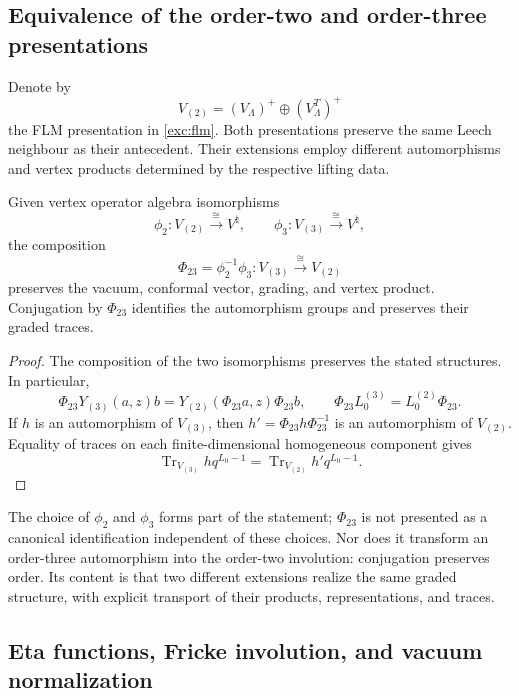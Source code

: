 \subsection{Equivalence of the order-two and order-three presentations}
\label{km:equivalencia-dos-tres}

Denote by
\[
 V_{(2)}=(V_\Lambda)^+\oplus(V_\Lambda^T)^+
\]
the FLM presentation in \eqref{exc:flm}. Both presentations preserve
the same Leech neighbour as their antecedent. Their extensions employ
different automorphisms and vertex products determined by
the respective lifting data.

\begin{theorem}
\label{km:equivalencia-voa}
Given vertex operator algebra isomorphisms
\[
 \phi_2:V_{(2)}\xrightarrow{\ \cong\ }V^\natural,
 \qquad
 \phi_3:V_{(3)}\xrightarrow{\ \cong\ }V^\natural,
\]
the composition
\begin{equation}
 \Phi_{23}=\phi_2^{-1}\phi_3:
 V_{(3)}\xrightarrow{\ \cong\ }V_{(2)}
 \label{km:Phi23}
\end{equation}
preserves the vacuum, conformal vector, grading, and vertex
product. Conjugation by \(\Phi_{23}\) identifies the automorphism
groups and preserves their graded traces.
\end{theorem}
\begin{proof}
The composition of the two isomorphisms preserves the stated
structures. In particular,
\[
 \Phi_{23}Y_{(3)}(a,z)b
 =Y_{(2)}(\Phi_{23}a,z)\Phi_{23}b,
 \qquad
 \Phi_{23}L_0^{(3)}=L_0^{(2)}\Phi_{23}.
\]
If \(h\) is an automorphism of \(V_{(3)}\), then
\(h' =\Phi_{23}h\Phi_{23}^{-1}\) is an automorphism of
\(V_{(2)}\). Equality of traces on each finite-dimensional homogeneous
component gives
\[
 \operatorname{Tr}_{V_{(3)}}h q^{L_0-1}
 =\operatorname{Tr}_{V_{(2)}}h' q^{L_0-1}.
\]
\end{proof}

The choice of \(\phi_2\) and \(\phi_3\) forms part of the statement;
\(\Phi_{23}\) is not presented as a canonical identification
independent of these choices. Nor does it transform an order-three
automorphism into the order-two involution: conjugation preserves
order. Its content is that two different extensions realize the
same graded structure, with explicit transport of their products,
representations, and traces.

\subsection{Eta functions, Fricke involution, and vacuum normalization}
\label{km:fricke}

